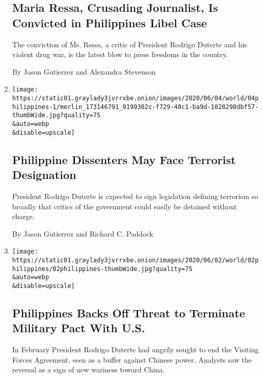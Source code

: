 \begin{enumerate}
  \hypertarget{maria-ressa-crusading-journalist-is-convicted-in-philippines-libel-case}{%
  \subsection{Maria Ressa, Crusading Journalist, Is Convicted in
  Philippines Libel
  Case}\label{maria-ressa-crusading-journalist-is-convicted-in-philippines-libel-case}}

  The conviction of Ms. Ressa, a critic of President Rodrigo Duterte and
  his violent drug war, is the latest blow to press freedoms in the
  country.

  By Jason Gutierrez and Alexandra Stevenson
\item
  \href{/2020/06/04/world/asia/duterte-philippines-terrorism-drug.html}{}

  \texttt{[image: https://static01.graylady3jvrrxbe.onion/images/2020/06/04/world/04philippines-1/merlin\_173146791\_9199302c-f729-48c1-ba9d-1028298dbf57-thumbWide.jpg?quality=75\\\&auto=webp\\\&disable=upscale]}

  \hypertarget{philippine-dissenters-may-face-terrorist-designation}{%
  \subsection{Philippine Dissenters May Face Terrorist
  Designation}\label{philippine-dissenters-may-face-terrorist-designation}}

  President Rodrigo Duterte is expected to sign legislation defining
  terrorism so broadly that critics of the government could easily be
  detained without charge.

  By Jason Gutierrez and Richard C. Paddock
\item
  \href{/2020/06/02/world/asia/philippines-military-pact-us-duterte.html}{}

  \texttt{[image: https://static01.graylady3jvrrxbe.onion/images/2020/06/02/world/02philippines/02philippines-thumbWide.jpg?quality=75\\\&auto=webp\\\&disable=upscale]}

  \hypertarget{philippines-backs-off-threat-to-terminate-military-pact-with-us}{%
  \subsection{Philippines Backs Off Threat to Terminate Military Pact
  With
  U.S.}\label{philippines-backs-off-threat-to-terminate-military-pact-with-us}}

  In February President Rodrigo Duterte had angrily sought to end the
  Visiting Forces Agreement, seen as a buffer against Chinese power.
  Analysts saw the reversal as a sign of new wariness toward China.


\end{enumerate}
